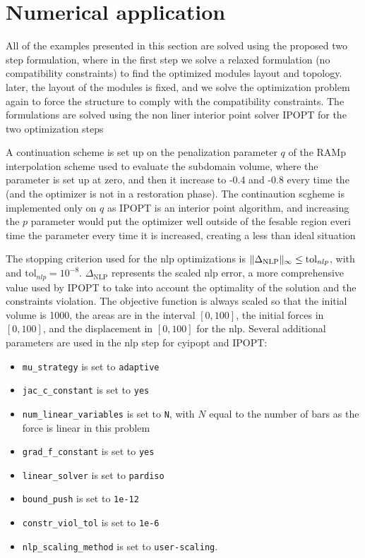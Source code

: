 \section{Numerical application}\label{sec:06_num_app}
All of the examples presented in this section are solved using the proposed two step formulation, where in the first step we solve a relaxed formulation (no compatibility constraints) to find the optimized modules layout and topology. later, the layout of the modules is fixed, and we solve the optimization problem again to force the structure to comply with the compatibility constraints. The formulations are solved using the non liner interior point solver IPOPT for the two optimization steps 

A continuation scheme is set up on the penalization parameter $q$ of the RAMp interpolation scheme used to evaluate the subdomain volume, where the parameter is set up at zero, and then it increase to -0.4 and -0.8 every time the (and the optimizer is not in a restoration phase). The continaution scgheme is implemented only on $q$ as IPOPT is an interior point algorithm, and increasing the $p$ parameter would put the optimizer well outside of the fesable region everi time the parameter every time it is increased, creating a less than ideal situation

The stopping criterion used for the \gls{nlp} optimizations is $\lVert\Delta_{\text{NLP}}\rVert_\infty \leq \text{tol}_{nlp}$, with and $\text{tol}_{nlp}=10^{-8}$. $\Delta_{\text{NLP}}$ represents the scaled \gls{nlp} error, a more comprehensive value used by IPOPT to take into account the optimality of the solution and the constraints violation. The objective function is always scaled so that the initial volume is 1000, the areas are in the interval $[0,100]$, the initial forces in $[0,100]$, and the displacement in $[0,100]$ for the \gls{nlp}. Several additional parameters are used in the \gls{nlp} step for cyipopt and IPOPT:
\begin{itemize}
    \item \texttt{mu\_strategy} is set to \texttt{adaptive} 
    \item \texttt{jac\_c\_constant} is set to \texttt{yes} 
    \item \texttt{num\_linear\_variables} is set to \texttt{N}, with $N$ equal to the number of bars as the force is linear in this problem
    \item \texttt{grad\_f\_constant} is set to \texttt{yes} 
    \item \texttt{linear\_solver} is set to \texttt{pardiso}
    \item \texttt{bound\_push} is set to \texttt{1e-12}
    \item \texttt{constr\_viol\_tol} is set to \texttt{1e-6}
    \item \texttt{nlp\_scaling\_method} is set to \texttt{user-scaling}.
\end{itemize}


